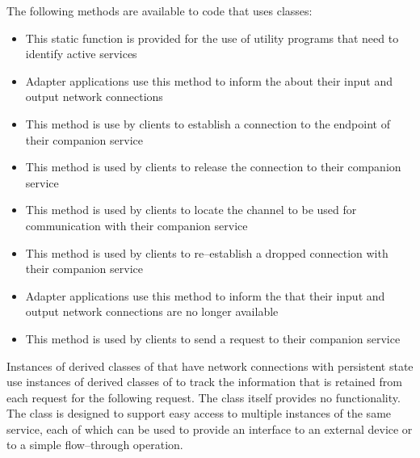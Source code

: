 The following methods are available to code that uses
 classes:
\begin{itemize}
\item \textbf{} This static function is provided for the use
of utility programs that need to identify active services
\item \textbf{} Adapter applications use this method to
inform the  about their input and output
\yarp{} network connections
\item \textbf{} This method is use by clients to establish a
connection to the endpoint of their companion service
\item \textbf{} This method is used by clients to release
the connection to their companion service
\item \textbf{} This method is used by clients to locate the channel
to be used for communication with their companion service
\item \textbf{} This method is used by clients to
re--establish a dropped connection with their companion service
\item \textbf{} Adapter applications use this method to
inform the  that their input and output
\yarp{} network connections are no longer available
\item \textbf{} This method is used by clients to send a request to their
companion service
\end{itemize}
\secondaryEnd{}
Instances of derived classes of  that have \yarp{}
network connections with persistent state use instances of
derived classes of  to track the information that
is retained from each request for the following request.
The  class itself provides no functionality.
\secondaryEnd{}
The  class is designed to
support easy access to multiple instances of the same service, each of which can be used
to provide an interface to an external device or to a simple flow--through operation.\\

